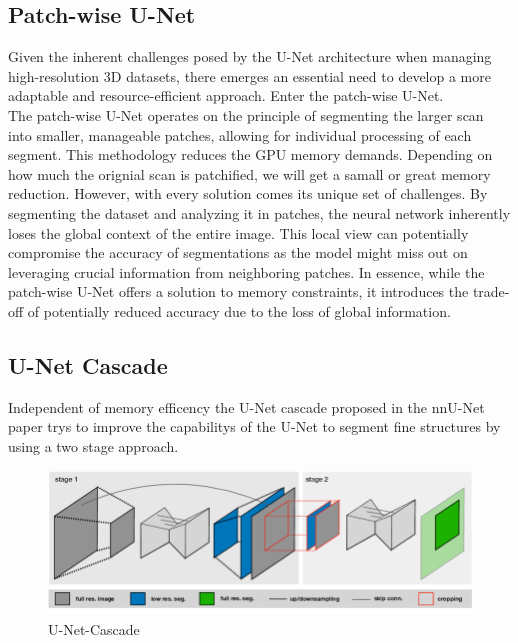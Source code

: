 \subsection{Patch-wise U-Net}
Given the inherent challenges posed by the U-Net architecture when managing high-resolution 3D datasets, there emerges an essential need to develop a more adaptable and resource-efficient approach.
Enter the patch-wise U-Net.\\[1ex]
The patch-wise U-Net operates on the principle of segmenting the larger scan into smaller, manageable patches, allowing for individual processing of each segment.\cite[5-7]{lee_automatic_2020}
This methodology reduces the GPU memory demands. Depending on how much the orignial scan is patchified, we will get a samall or great memory reduction. However, with every solution comes its unique set of challenges.
By segmenting the dataset and analyzing it in patches, the neural network inherently loses the global context of the entire image.
This local view can potentially compromise the accuracy of segmentations as the model might miss out on leveraging crucial information from neighboring patches.
In essence, while the patch-wise U-Net offers a solution to memory constraints, it introduces the trade-off of potentially reduced accuracy due to the loss of global information.

\subsection{U-Net Cascade}
Independent of memory efficency the U-Net cascade proposed in the nnU-Net paper\cite{isensee_nnu-net_2018} trys to improve the capabilitys of the U-Net to
segment fine structures by using a two stage approach.

\begin{figure}[H]
	\centering
	\includegraphics[width=1\linewidth]{images/UNet-Cascade}
	\caption{U-Net-Cascade\cite[4]{isensee_nnu-net_2018}}
	\label{fig:UNet-Cascade}
\end{figure}

